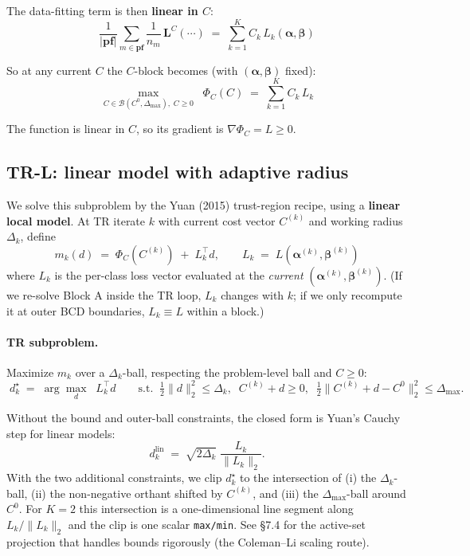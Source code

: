 \documentclass[11pt,a4paper]{article}
\begin{document}
The data-fitting term is then \textbf{linear in $C$}:
\[
\frac{1}{|\mathbf{pf}|}\sum_{m \in \mathbf{pf}}\frac{1}{n_m}\,\mathbf{L}^{C}(\cdots) \;=\; \sum_{k=1}^{K} C_k\,L_k(\boldsymbol{\alpha},\boldsymbol{\beta})
\]

So at any current $C$ the $C$-block becomes (with $(\boldsymbol\alpha,\boldsymbol\beta)$ fixed):
\begin{equation}
\boxed{\;\max_{C \in \mathcal B(C^0,\Delta_{\max}),\;C\ge 0}\;\;\Phi_C(C)\;=\;\sum_{k=1}^{K} C_k\,L_k\;}
\end{equation}

The function is linear in $C$, so its gradient is $\nabla \Phi_C = L \ge 0$.

\subsection{TR-L: linear model with adaptive radius}

We solve this subproblem by the Yuan (2015) trust-region recipe, using a \textbf{linear local model}. At TR iterate $k$ with current cost vector $C^{(k)}$ and working radius $\Delta_k$, define
\begin{equation}
m_k(d) \;=\; \Phi_C(C^{(k)}) \;+\; L_k^\top d,\qquad L_k \;=\; L(\boldsymbol\alpha^{(k)},\boldsymbol\beta^{(k)})
\end{equation}
where $L_k$ is the per-class loss vector evaluated at the \emph{current} $(\boldsymbol\alpha^{(k)},\boldsymbol\beta^{(k)})$. (If we re-solve Block A inside the TR loop, $L_k$ changes with $k$; if we only recompute it at outer BCD boundaries, $L_k \equiv L$ within a block.)

\paragraph{TR subproblem.} Maximize $m_k$ over a $\Delta_k$-ball, respecting the problem-level ball and $C \ge 0$:
\begin{equation}
\boxed{\;d_k^\star \;=\; \arg\max_{d}\;\;L_k^\top d\qquad\text{s.t.}\;\;\tfrac12\|d\|_2^2 \le \Delta_k,\;\;C^{(k)}+d \ge 0,\;\;\tfrac12\|C^{(k)}+d-C^0\|_2^2 \le \Delta_{\max}.\;}
\end{equation}

Without the bound and outer-ball constraints, the closed form is Yuan's Cauchy step for linear models:
\[
d_k^{\mathrm{lin}} \;=\; \sqrt{2\Delta_k}\;\frac{L_k}{\|L_k\|_2}.
\]
With the two additional constraints, we clip $d_k^\star$ to the intersection of (i) the $\Delta_k$-ball, (ii) the non-negative orthant shifted by $C^{(k)}$, and (iii) the $\Delta_{\max}$-ball around $C^0$. For $K = 2$ this intersection is a one-dimensional line segment along $L_k/\|L_k\|_2$ and the clip is one scalar \texttt{max/min}. See \S 7.4 for the active-set projection that handles bounds rigorously (the Coleman--Li scaling route).
\end{document}
